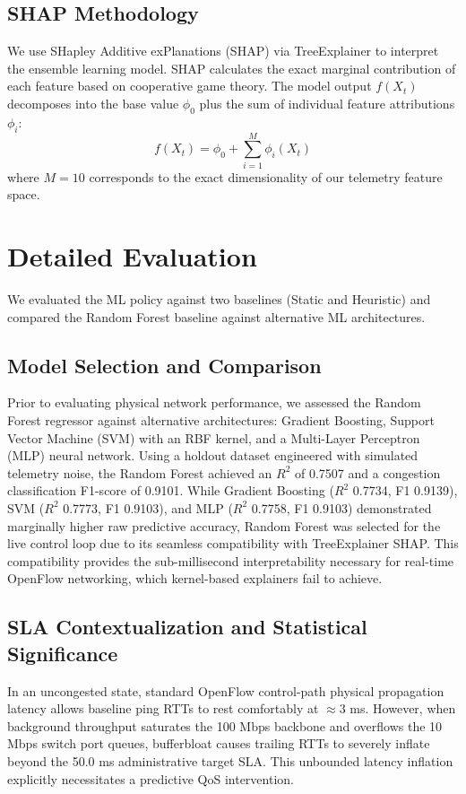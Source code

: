\documentclass[journal]{IEEEtran}
\begin{document}
\subsection{SHAP Methodology}
We use SHapley Additive exPlanations (SHAP) via TreeExplainer to interpret the ensemble learning model. SHAP calculates the exact marginal contribution of each feature based on cooperative game theory. The model output $f(X_{t})$ decomposes into the base value $\phi_{0}$ plus the sum of individual feature attributions $\phi_{i}$:
\begin{equation}
f(X_{t}) = \phi_{0} + \sum_{i=1}^{M} \phi_{i}(X_{t})
\end{equation}
where $M=10$ corresponds to the exact dimensionality of our telemetry feature space.

\section{Detailed Evaluation}
We evaluated the ML policy against two baselines (Static and Heuristic) and compared the Random Forest baseline against alternative ML architectures.

\subsection{Model Selection and Comparison}
Prior to evaluating physical network performance, we assessed the Random Forest regressor against alternative architectures: Gradient Boosting, Support Vector Machine (SVM) with an RBF kernel, and a Multi-Layer Perceptron (MLP) neural network. Using a holdout dataset engineered with simulated telemetry noise, the Random Forest achieved an $R^2$ of 0.7507 and a congestion classification F1-score of 0.9101. While Gradient Boosting ($R^2$ 0.7734, F1 0.9139), SVM ($R^2$ 0.7773, F1 0.9103), and MLP ($R^2$ 0.7758, F1 0.9103) demonstrated marginally higher raw predictive accuracy, Random Forest was selected for the live control loop due to its seamless compatibility with TreeExplainer SHAP. This compatibility provides the sub-millisecond interpretability necessary for real-time OpenFlow networking, which kernel-based explainers fail to achieve.

\subsection{SLA Contextualization and Statistical Significance}
In an uncongested state, standard OpenFlow control-path physical propagation latency allows baseline ping RTTs to rest comfortably at $\approx 3$ ms. However, when background throughput saturates the 100 Mbps backbone and overflows the 10 Mbps switch port queues, bufferbloat causes trailing RTTs to severely inflate beyond the 50.0 ms administrative target SLA. This unbounded latency inflation explicitly necessitates a predictive QoS intervention.
\end{document}
